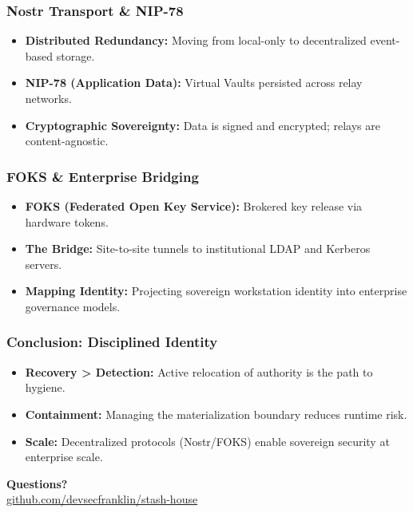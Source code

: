 \documentclass[aspectratio=169]{beamer}
\begin{document}
\begin{frame}
\frametitle{Nostr Transport \& NIP-78}
\begin{itemize}
\item \textbf{Distributed Redundancy:} Moving from local-only to decentralized event-based storage.
\item \textbf{NIP-78 (Application Data):} Virtual Vaults persisted across relay networks.
\item \textbf{Cryptographic Sovereignty:} Data is signed and encrypted; relays are content-agnostic.
\end{itemize}
\end{frame}

\begin{frame}
\frametitle{FOKS \& Enterprise Bridging}
\begin{itemize}
\item \textbf{FOKS (Federated Open Key Service):} Brokered key release via hardware tokens.
\item \textbf{The Bridge:} Site-to-site tunnels to institutional LDAP and Kerberos servers.
\item \textbf{Mapping Identity:} Projecting sovereign workstation identity into enterprise governance models.
\end{itemize}
\end{frame}

\begin{frame}
\frametitle{Conclusion: Disciplined Identity}
\begin{itemize}
\item \textbf{Recovery > Detection:} Active relocation of authority is the path to hygiene.
\item \textbf{Containment:} Managing the materialization boundary reduces runtime risk.
\item \textbf{Scale:} Decentralized protocols (Nostr/FOKS) enable sovereign security at enterprise scale.
\end{itemize}
\vspace{1em}
\centering
\textbf{Questions?}\\
\small \href{https://github.com/devsecfranklin/stash-house}{github.com/devsecfranklin/stash-house}
\end{frame}
\end{document}
